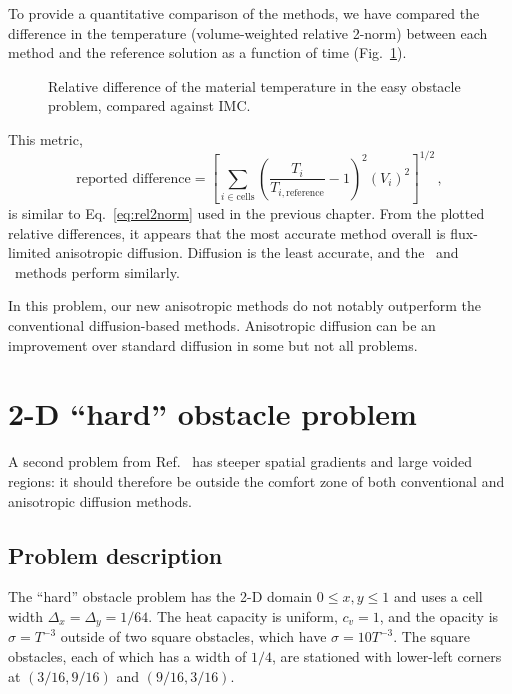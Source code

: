 To provide a quantitative comparison of the
methods, we have compared the difference in the temperature (volume-weighted
relative 2-norm) between each method and the reference solution as a function of
time (Fig.~\ref{fig:easymkConvergence}).
%
\begin{figure}[htb]
  \centering
  
  \caption{Relative difference of the material temperature in the easy obstacle
  problem, compared against IMC.}
  \label{fig:easymkConvergence}
\end{figure}
%
This metric,
\begin{equation*}
  \text{reported difference} =
  \left[ \sum_{i \in \text{cells}} \left(
  \frac{T_i}{T_{i,\text{reference}}} - 1 \right)^2 (V_i)^2\right]^{1/2} \,,
\end{equation*}
is similar to Eq.~\eqref{eq:rel2norm} used in the previous chapter.
From the plotted relative differences, it appears that the most accurate method
overall is flux-limited anisotropic diffusion. Diffusion is the least accurate,
and the \APone\ and \Pone\ methods perform similarly.

In this problem, our new anisotropic methods do not notably outperform the
conventional diffusion-based methods. Anisotropic diffusion can be an
improvement over standard diffusion in some but not all problems.

\section{2-D \texorpdfstring{``hard''}{hard} obstacle problem}

A second problem from Ref.~\cite{Mou2006} has steeper spatial gradients and
large voided regions: it should therefore be outside the comfort zone of
both conventional and anisotropic diffusion methods.

\subsection{Problem description}

The ``hard'' obstacle problem has the 2-D domain $0 \le x,y \le 1$ and uses a
cell width $\Delta_x=\Delta_y=1/64$. The heat capacity is uniform, $c_v=1$, and
the opacity is $\sigma=T^{-3}$ outside of two square obstacles, which have
$\sigma=10 T^{-3}$. The square obstacles, each of which has a width of $1/4$, are
stationed with lower-left corners at $(3/16, 9/16)$ and $(9/16,3/16)$.

